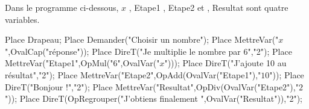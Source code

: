 \begin{exercice*}
    Dans le programme ci-dessous, \og $x$ \fg{}, \og Etape1 \fg{}, \og Etape2 \fg{} et , \og Resultat \fg{} sont quatre variables.

    \hspace*{-15mm}
    \begin{minipage}{0.6\linewidth}
        \begin{Scratch}[Echelle=0.7]
            Place Drapeau;
            Place Demander("Choisir un nombre");
            Place MettreVar("$x$",OvalCap("réponse"));
            Place DireT("Je multiplie le nombre par $6$","2");
            Place MettreVar("Etape1",OpMul("$6$",OvalVar("$x$")));
            Place DireT("J'ajoute 10 au résultat","2");
            Place MettreVar("Etape2",OpAdd(OvalVar("Etape1"),"$10$"));
            Place DireT("Bonjour !","2");
            Place MettreVar("Resultat",OpDiv(OvalVar("Etape2"),"$2$"));
            Place DireT(OpRegrouper("J'obtiens finalement ",OvalVar("Resultat")),"2");
        \end{Scratch}
    \end{minipage}    
    \begin{minipage}{0.35\linewidth}
        \vspace*{-36mm}
        \hspace*{15mm}
\end{minipage}
\end{exercice*}
